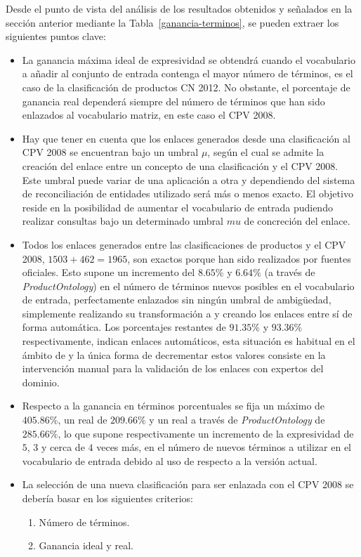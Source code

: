 Desde el punto de vista del análisis de los resultados obtenidos y señalados en la sección anterior mediante la 
Tabla~\ref{ganancia-terminos}, se pueden extraer los siguientes puntos clave:
\begin{itemize}
 \item La ganancia máxima ideal de expresividad se obtendrá cuando el vocabulario a añadir al conjunto de entrada 
contenga el mayor número de términos, es el caso de la clasificación de productos CN 2012. 
No obstante, el porcentaje de ganancia real dependerá siempre del número de términos que han sido enlazados 
al vocabulario matriz, en este caso el CPV 2008.
\item Hay que tener en cuenta que los enlaces generados desde una clasificación al CPV 2008 se encuentran 
bajo un umbral $\mu$, según el cual se admite la creación del enlace entre un concepto de una clasificación 
y el CPV 2008. Este umbral puede variar de una aplicación a otra y dependiendo del sistema de reconciliación 
de entidades utilizado será más o menos exacto. El objetivo reside en la posibilidad de aumentar el vocabulario 
de entrada pudiendo realizar consultas bajo un determinado umbral $mu$ de concreción del enlace.
\item Todos los enlaces generados entre las clasificaciones de productos y el CPV 2008, $1503+462 = 1965$, son exactos 
porque han sido realizados por fuentes oficiales. Esto supone un incremento del $8.65\%$ y $6.64\%$ (a través de \textit{ProductOntology}) 
 en el número de términos nuevos posibles en el vocabulario de entrada, perfectamente enlazados sin ningún umbral de ambig\"{u}edad, 
simplemente realizando su transformación a \linkeddata y creando los enlaces entre sí de forma automática. Los porcentajes 
restantes de $91.35\%$ y $93.36\%$ respectivamente, indican enlaces automáticos, esta situación es habitual en el ámbito 
de \linkeddata y la única forma de decrementar estos valores consiste en la intervención manual para la validación 
de los enlaces con expertos del dominio.
\item Respecto a la ganancia en términos porcentuales se fija un máximo de $405.86\%$, un real de $209.66\%$ y un real a través 
de \textit{ProductOntology} de $285.66\%$, lo que supone respectivamente un incremento de la expresividad de $5$, $3$ y cerca de 
$4$ veces más, en el número de nuevos términos a utilizar en el vocabulario de entrada debido al uso de \linkeddata respecto 
a la versión actual.
\item La selección de una nueva clasificación para ser enlazada con el CPV 2008 se debería basar en los siguientes criterios:
\begin{enumerate}
 \item Número de términos.
 \item Ganancia ideal y real.
\end{enumerate}


\end{itemize}
